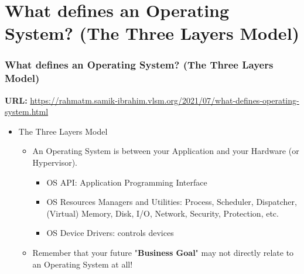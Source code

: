 \documentclass[aspectratio=169, xcolor=table, notheorems, hyperref={pdfpagelabels=false}]{beamer}
\begin{document}
\section{What defines an Operating System? (The Three Layers Model)}
\begin{frame}[fragile]
\frametitle{What defines an Operating System? (The Three Layers Model)}
\textbf{URL:} {\footnotesize \url{https://rahmatm.samik-ibrahim.vlsm.org/2021/07/what-defines-operating-system.html}}
\begin{multicols}{2}
\begin{table}
\end{table}
  \vfill \null
\columnbreak
  \begin{itemize}
    \item The Three Layers Model
  \begin{itemize}
    \item An Operating System is between your Application and your Hardware (or Hypervisor).
  \begin{itemize}
    \item OS API: Application Programming Interface
    \item OS Resources Managers and Utilities: Process, Scheduler, Dispatcher,
             (Virtual) Memory, Disk, I/O, Network, Security, Protection, etc.
    \item OS Device Drivers: controls devices
  \end{itemize}
    \item Remember that your future "\textbf{Business Goal}" may not directly relate to an Operating System at all!
  \end{itemize}
  \end{itemize}
  \vfill \null
\end{multicols}
\end{frame}
\end{document}
